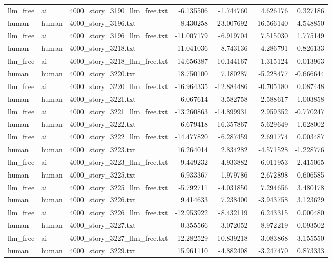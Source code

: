 \begin{longtable}{lllrrrr}
llm\_free & ai & 4000\_story\_3190\_llm\_free.txt & -6.135506 & -1.744760 & 4.626176 & 0.327186 \\
human & human & 4000\_story\_3196.txt & 8.430258 & 23.007692 & -16.566140 & -4.548850 \\
llm\_free & ai & 4000\_story\_3196\_llm\_free.txt & -11.007179 & -6.919704 & 7.515030 & 1.775149 \\
human & human & 4000\_story\_3218.txt & 11.041036 & -8.743136 & -4.286791 & 0.826133 \\
llm\_free & ai & 4000\_story\_3218\_llm\_free.txt & -14.656387 & -10.144167 & -1.315124 & 0.013963 \\
human & human & 4000\_story\_3220.txt & 18.750100 & 7.180287 & -5.228477 & -0.666644 \\
llm\_free & ai & 4000\_story\_3220\_llm\_free.txt & -16.964335 & -12.884486 & -0.705180 & 0.087448 \\
human & human & 4000\_story\_3221.txt & 6.067614 & 3.582758 & 2.588617 & 1.003858 \\
llm\_free & ai & 4000\_story\_3221\_llm\_free.txt & -13.260863 & -14.899931 & 2.959352 & -0.770247 \\
human & human & 4000\_story\_3222.txt & 6.679418 & 16.357867 & -5.629649 & -1.628002 \\
llm\_free & ai & 4000\_story\_3222\_llm\_free.txt & -14.477820 & -6.287459 & 2.691774 & 0.003487 \\
human & human & 4000\_story\_3223.txt & 16.264014 & 2.834282 & -4.571528 & -1.228776 \\
llm\_free & ai & 4000\_story\_3223\_llm\_free.txt & -9.449232 & -4.933882 & 6.011953 & 2.415065 \\
human & human & 4000\_story\_3225.txt & 6.933367 & 1.979786 & -2.672898 & -0.606585 \\
llm\_free & ai & 4000\_story\_3225\_llm\_free.txt & -5.792711 & -4.031850 & 7.294656 & 3.480178 \\
human & human & 4000\_story\_3226.txt & 9.414633 & 7.238400 & -3.943758 & 3.123629 \\
llm\_free & ai & 4000\_story\_3226\_llm\_free.txt & -12.953922 & -8.432119 & 6.243315 & 0.000480 \\
human & human & 4000\_story\_3227.txt & -0.355566 & -3.072052 & -8.972219 & -0.093502 \\
llm\_free & ai & 4000\_story\_3227\_llm\_free.txt & -12.282529 & -10.839218 & 3.083868 & -3.155550 \\
human & human & 4000\_story\_3229.txt & 15.961110 & -4.882408 & -3.247470 & 0.873333 \\

\end{longtable}
